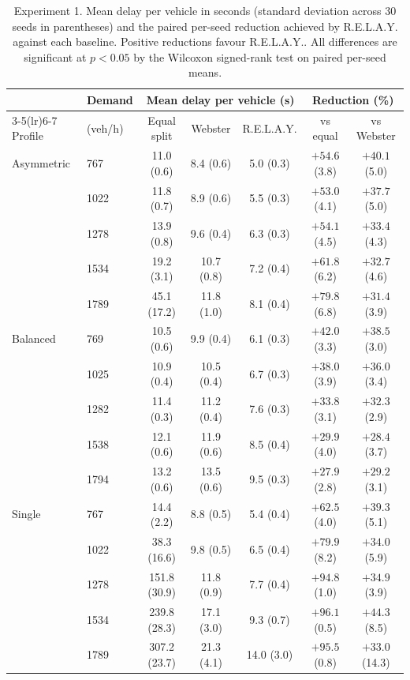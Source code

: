 \documentclass[journal]{IEEEtran}
\newcommand{\relay}{R.E.L.A.Y.}
\begin{document}
\begin{table}[t]
\centering
\caption{Experiment 1. Mean delay per vehicle in seconds (standard deviation across 30 seeds in
parentheses) and the paired per-seed reduction achieved by \relay{} against each baseline. Positive
reductions favour \relay. All differences are significant at $p < 0.05$ by the Wilcoxon signed-rank
test on paired per-seed means.}
\label{tab:exp1}
\small
\begin{tabular}{llccccc}
\toprule
& Demand & \multicolumn{3}{c}{Mean delay per vehicle (s)} & \multicolumn{2}{c}{Reduction (\%)} \\
\cmidrule(lr){3-5}\cmidrule(lr){6-7}
Profile & (veh/h) & Equal split & Webster & \relay{} & vs equal & vs Webster \\
\midrule
Asymmetric & 767  & 11.0 (0.6)  & 8.4 (0.6)  & 5.0 (0.3)  & $+54.6$ (3.8) & $+40.1$ (5.0) \\
           & 1022 & 11.8 (0.7)  & 8.9 (0.6)  & 5.5 (0.3)  & $+53.0$ (4.1) & $+37.7$ (5.0) \\
           & 1278 & 13.9 (0.8)  & 9.6 (0.4)  & 6.3 (0.3)  & $+54.1$ (4.5) & $+33.4$ (4.3) \\
           & 1534 & 19.2 (3.1)  & 10.7 (0.8) & 7.2 (0.4)  & $+61.8$ (6.2) & $+32.7$ (4.6) \\
           & 1789 & 45.1 (17.2) & 11.8 (1.0) & 8.1 (0.4)  & $+79.8$ (6.8) & $+31.4$ (3.9) \\
\midrule
Balanced   & 769  & 10.5 (0.6)  & 9.9 (0.4)  & 6.1 (0.3)  & $+42.0$ (3.3) & $+38.5$ (3.0) \\
           & 1025 & 10.9 (0.4)  & 10.5 (0.4) & 6.7 (0.3)  & $+38.0$ (3.9) & $+36.0$ (3.4) \\
           & 1282 & 11.4 (0.3)  & 11.2 (0.4) & 7.6 (0.3)  & $+33.8$ (3.1) & $+32.3$ (2.9) \\
           & 1538 & 12.1 (0.6)  & 11.9 (0.6) & 8.5 (0.4)  & $+29.9$ (4.0) & $+28.4$ (3.7) \\
           & 1794 & 13.2 (0.6)  & 13.5 (0.6) & 9.5 (0.3)  & $+27.9$ (2.8) & $+29.2$ (3.1) \\
\midrule
Single     & 767  & 14.4 (2.2)  & 8.8 (0.5)  & 5.4 (0.4)  & $+62.5$ (4.0) & $+39.3$ (5.1) \\
           & 1022 & 38.3 (16.6) & 9.8 (0.5)  & 6.5 (0.4)  & $+79.9$ (8.2) & $+34.0$ (5.9) \\
           & 1278 & 151.8 (30.9)& 11.8 (0.9) & 7.7 (0.4)  & $+94.8$ (1.0) & $+34.9$ (3.9) \\
           & 1534 & 239.8 (28.3)& 17.1 (3.0) & 9.3 (0.7)  & $+96.1$ (0.5) & $+44.3$ (8.5) \\
           & 1789 & 307.2 (23.7)& 21.3 (4.1) & 14.0 (3.0) & $+95.5$ (0.8) & $+33.0$ (14.3) \\
\bottomrule
\end{tabular}
\end{table}
\end{document}
